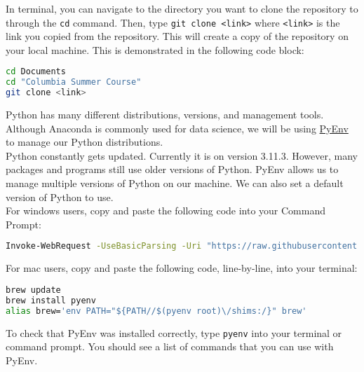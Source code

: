 \documentclass{homework}
\begin{document}
\begin{problem}
\begin{enumerate}
    In terminal, you can navigate to the directory you want to clone the repository to through the \texttt{cd} command. Then, type \texttt{git clone <link>} where \texttt{<link>} is the link you copied from the repository. This will create a copy of the repository on your local machine. This is demonstrated in the following code block:\\

    \begin{lstlisting}[language=bash]
cd Documents
cd "Columbia Summer Course"
git clone <link>
    \end{lstlisting}
\end{enumerate}

\end{problem}

\begin{problem}

    Python has many different distributions, versions, and management tools. Although Anaconda is commonly used for data science, we will be using \href{https://github.com/pyenv/pyenv}{PyEnv} to manage our Python distributions.\\

    Python constantly gets updated. Currently it is on version 3.11.3. However, many packages and programs still use older versions of Python. PyEnv allows us to manage multiple versions of Python on our machine. We can also set a default version of Python to use.\\
    
    For windows users, copy and paste the following code into your Command Prompt: 
\begin{lstlisting}[language=bash]
Invoke-WebRequest -UseBasicParsing -Uri "https://raw.githubusercontent.com/pyenv-win/pyenv-win/master/pyenv-win/install-pyenv-win.ps1" -OutFile "./install-pyenv-win.ps1"; &"./install-pyenv-win.ps1"
\end{lstlisting}

    For mac users, copy and paste the following code, line-by-line, into your terminal: 

\begin{lstlisting}[language=bash]
brew update
brew install pyenv
alias brew='env PATH="${PATH//$(pyenv root)\/shims:/}" brew'
\end{lstlisting}

To check that PyEnv was installed correctly, type \texttt{pyenv} into your terminal or command prompt. You should see a list of commands that you can use with PyEnv.\\


\end{problem}
\end{document}
